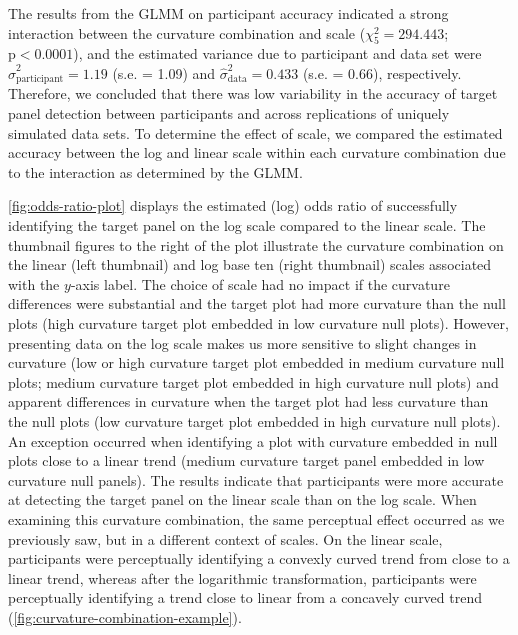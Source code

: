\documentclass[12pt]{article}
\begin{document}
The results from the GLMM on participant accuracy indicated a strong
interaction between the curvature combination and scale
(\(\chi^2_5 = 294.443\); \(\text{p} <0.0001\)), and the estimated
variance due to participant and data set were
\(\hat\sigma^2_{\text{participant}} = 1.19\) (s.e. = 1.09) and
\(\hat\sigma^2_{\text{data}} = 0.433\) (s.e. = 0.66), respectively.
Therefore, we concluded that there was low variability in the accuracy
of target panel detection between participants and across replications
of uniquely simulated data sets. To determine the effect of scale, we
compared the estimated accuracy between the log and linear scale within
each curvature combination due to the interaction as determined by the
GLMM.

\cref{fig:odds-ratio-plot} displays the estimated (log) odds ratio of
successfully identifying the target panel on the log scale compared to
the linear scale. The thumbnail figures to the right of the plot
illustrate the curvature combination on the linear (left thumbnail) and
log base ten (right thumbnail) scales associated with the \(y\)-axis
label. The choice of scale had no impact if the curvature differences
were substantial and the target plot had more curvature than the null
plots (high curvature target plot embedded in low curvature null plots).
However, presenting data on the log scale makes us more sensitive to
slight changes in curvature (low or high curvature target plot embedded
in medium curvature null plots; medium curvature target plot embedded in
high curvature null plots) and apparent differences in curvature when
the target plot had less curvature than the null plots (low curvature
target plot embedded in high curvature null plots). An exception
occurred when identifying a plot with curvature embedded in null plots
close to a linear trend (medium curvature target panel embedded in low
curvature null panels). The results indicate that participants were more
accurate at detecting the target panel on the linear scale than on the
log scale. When examining this curvature combination, the same
perceptual effect occurred as we previously saw, but in a different
context of scales. On the linear scale, participants were perceptually
identifying a convexly curved trend from close to a linear trend,
whereas after the logarithmic transformation, participants were
perceptually identifying a trend close to linear from a concavely curved
trend (\cref{fig:curvature-combination-example}).
\end{document}
